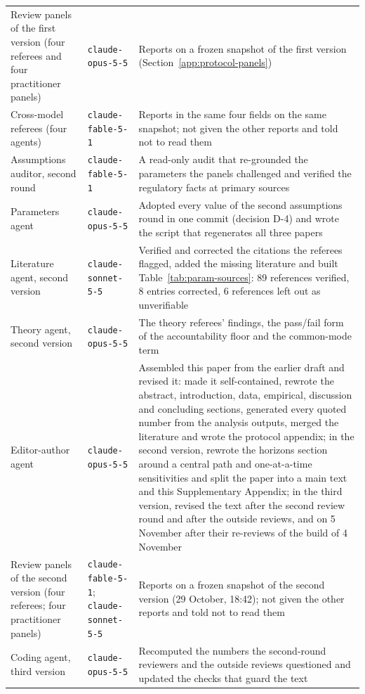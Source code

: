 {\begin{longtable}{@{}p{}p{}p{}@{}}
Review panels of the first version (four referees and four practitioner panels) & \texttt{claude-opus-5-5} & Reports on a frozen snapshot of the first version (Section~\ref{app:protocol-panels})\\
Cross-model referees (four agents) & \texttt{claude-fable-5-1} & Reports in the same four fields on the same snapshot; not given the other reports and told not to read them\\
Assumptions auditor, second round & \texttt{claude-fable-5-1} & A read-only audit that re-grounded the parameters the panels challenged and verified the regulatory facts at primary sources\\
Parameters agent & \texttt{claude-opus-5-5} & Adopted every value of the second assumptions round in one commit (decision D-4) and wrote the script that regenerates all three papers\\
Literature agent, second version & \texttt{claude-sonnet-5-5} & Verified and corrected the citations the referees flagged, added the missing literature and built Table~\ref{tab:param-sources}: 89 references verified, 8 entries corrected, 6 references left out as unverifiable\\
Theory agent, second version & \texttt{claude-opus-5-5} & The theory referees' findings, the pass/fail form of the accountability floor and the common-mode term\\
Editor-author agent & \texttt{claude-opus-5-5} & Assembled this paper from the earlier draft and revised it: made it self-contained, rewrote the abstract, introduction, data, empirical, discussion and concluding sections, generated every quoted number from the analysis outputs, merged the literature and wrote the protocol appendix; in the second version, rewrote the horizons section around a central path and one-at-a-time sensitivities and split the paper into a main text and this Supplementary Appendix; in the third version, revised the text after the second review round and after the outside reviews, and on 5 November after their re-reviews of the build of 4 November\\
Review panels of the second version (four referees; four practitioner panels) & \texttt{claude-fable-5-1}; \texttt{claude-sonnet-5-5} & Reports on a frozen snapshot of the second version (29 October, 18:42); not given the other reports and told not to read them\\
Coding agent, third version & \texttt{claude-opus-5-5} & Recomputed the numbers the second-round reviewers and the outside reviews questioned and updated the checks that guard the text\\

\end{longtable}}
